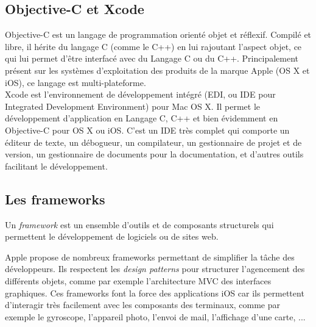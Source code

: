 
\subsection{Objective-C et Xcode}

Objective-C est un langage de programmation orienté objet et réflexif.
Compilé et libre, il hérite du langage C (comme le C++) en lui rajoutant l'aspect objet, ce qui lui permet d'être interfacé avec du Langage C ou du C++.
Principalement présent sur les systèmes d'exploitation des produits de la marque Apple (OS X et iOS), ce langage est multi-plateforme.
\\


Xcode est l'environnement de développement intégré (EDI, ou IDE pour Integrated Development Environment) pour Mac OS X.
Il permet le développement d'application en Langage C, C++ et bien évidemment en Objective-C pour OS X ou iOS.
C'est un IDE très complet qui comporte un éditeur de texte, un débogueur, un compilateur, un gestionnaire de projet et de version, un gestionnaire de documents pour la documentation, et d'autres outils facilitant le développement.
\\




\subsection{Les frameworks}

Un \textit{framework} est un ensemble d'outils et de composants structurels qui permettent le développement de logiciels ou de sites web.

Apple propose de nombreux frameworks permettant de simplifier la tâche des développeurs.
Ils respectent les \textit{design patterns} pour structurer l'agencement des différents objets, comme par exemple l'architecture MVC des interfaces graphiques.
Ces frameworks font la force des applications iOS car ils permettent d'interagir très facilement avec les composants des terminaux, comme par exemple le gyroscope, l'appareil photo, l'envoi de mail, l'affichage d'une carte, ...
\\


